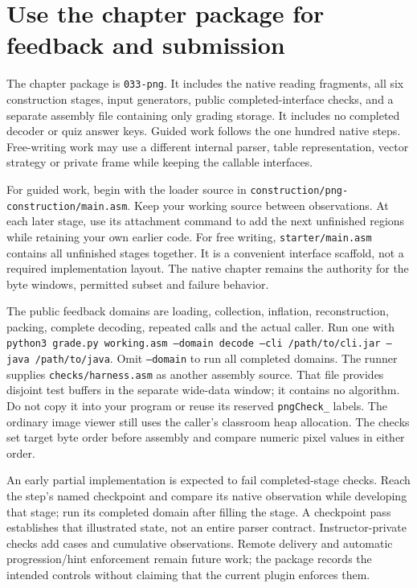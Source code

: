 \section{Use the chapter package for feedback and submission}
The chapter package is \texttt{033-png}. It includes the native reading fragments,
all six construction stages, input generators, public completed-interface checks,
and a separate assembly file containing only grading storage. It includes no
completed decoder or quiz answer keys. Guided work follows the one hundred native
steps. Free-writing work may use a different internal parser, table representation,
vector strategy or private frame while keeping the callable interfaces.

For guided work, begin with the loader source in
\texttt{construction/png-construction/main.asm}. Keep your working source between
observations. At each later stage, use its attachment command to add the next
unfinished regions while retaining your own earlier code. For free writing,
\texttt{starter/main.asm} contains all unfinished stages together. It is a convenient
interface scaffold, not a required implementation layout. The native chapter
remains the authority for the byte windows, permitted subset and failure behavior.

The public feedback domains are loading, collection, inflation, reconstruction,
packing, complete decoding, repeated calls and the actual caller. Run one with
\texttt{python3 grade.py working.asm --domain decode --cli /path/to/cli.jar
  --java /path/to/java}. Omit \texttt{--domain} to run all completed domains. The
runner supplies \texttt{checks/harness.asm} as another assembly source. That file
provides disjoint test buffers in the separate wide-data window; it contains no
algorithm. Do not copy it into your program or reuse its reserved
\texttt{pngCheck\_} labels. The ordinary image viewer still uses the caller's
classroom heap allocation. The checks set target byte order before assembly and
compare numeric pixel values in either order.

An early partial implementation is expected to fail completed-stage checks. Reach
the step's named checkpoint and compare its native observation while developing
that stage; run its completed domain after filling the stage. A checkpoint pass
establishes that illustrated state, not an entire parser contract. Instructor-private
checks add cases and cumulative observations. Remote delivery and automatic
progression/hint enforcement remain future work; the package records the intended
controls without claiming that the current plugin enforces them.

